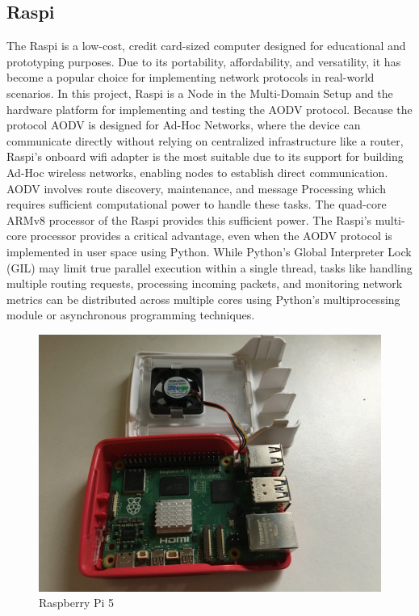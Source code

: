 \documentclass[]{nsm-thesis}
\begin{document}
\subsection{Raspi}
The Raspi is a low-cost, credit card-sized computer designed for educational and prototyping purposes. Due to its portability, affordability, and versatility, it has become a popular choice for implementing network protocols in real-world scenarios. In this project, Raspi is a Node in the Multi-Domain Setup and the hardware platform for implementing and testing the AODV protocol. Because the protocol AODV is designed for Ad-Hoc Networks, where the device can communicate directly without relying on centralized infrastructure like a router, Raspi’s onboard wifi adapter is the most suitable due to its support for building Ad-Hoc wireless networks, enabling nodes to establish direct communication.
AODV involves route discovery, maintenance, and message Processing which requires sufficient computational power to handle these tasks. The quad-core ARMv8 processor of the Raspi provides this sufficient power. The Raspi’s multi-core processor provides a critical advantage, even when the AODV protocol is implemented in user space using Python. While Python’s Global Interpreter Lock (GIL) may limit true parallel execution within a single thread, tasks like handling multiple routing requests, processing incoming packets, and monitoring network metrics can be distributed across multiple cores using Python’s multiprocessing module or asynchronous programming techniques.

\begin{figure}[h]
\graphicspath{{/image/}} %
\centering
\includegraphics[scale=0.04]{image/Raspi1.JPG} %
\caption{Raspberry Pi 5}
\label{fig:mesh2} %
\end{figure}
\end{document}
